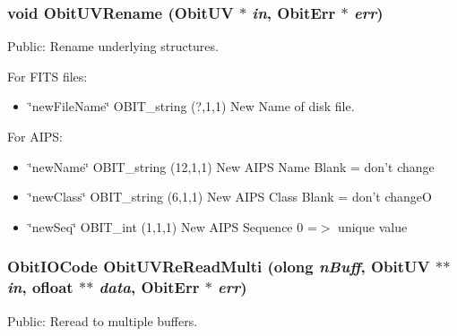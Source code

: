 \subsubsection{\setlength{\rightskip}{0pt plus 5cm}void Obit\-UVRename ({\bf Obit\-UV} $\ast$ {\em in}, {\bf Obit\-Err} $\ast$ {\em err})}\label{ObitUV_8h_a30}


Public: Rename underlying structures. 

For FITS files: \begin{itemize}
\item \char`\"{}new\-File\-Name\char`\"{} OBIT\_\-string (?,1,1) New Name of disk file.\end{itemize}
For AIPS: \begin{itemize}
\item \char`\"{}new\-Name\char`\"{} OBIT\_\-string (12,1,1) New AIPS Name Blank = don't change \item \char`\"{}new\-Class\char`\"{} OBIT\_\-string (6,1,1) New AIPS Class Blank = don't change\-O \item \char`\"{}new\-Seq\char`\"{} OBIT\_\-int (1,1,1) New AIPS Sequence 0 =$>$ unique value 
\end{itemize}
\subsubsection{\setlength{\rightskip}{0pt plus 5cm}Obit\-IOCode Obit\-UVRe\-Read\-Multi ({\bf olong} {\em n\-Buff}, {\bf Obit\-UV} $\ast$$\ast$ {\em in}, {\bf ofloat} $\ast$$\ast$ {\em data}, {\bf Obit\-Err} $\ast$ {\em err})}\label{ObitUV_8h_a39}


Public: Reread to multiple buffers. 

